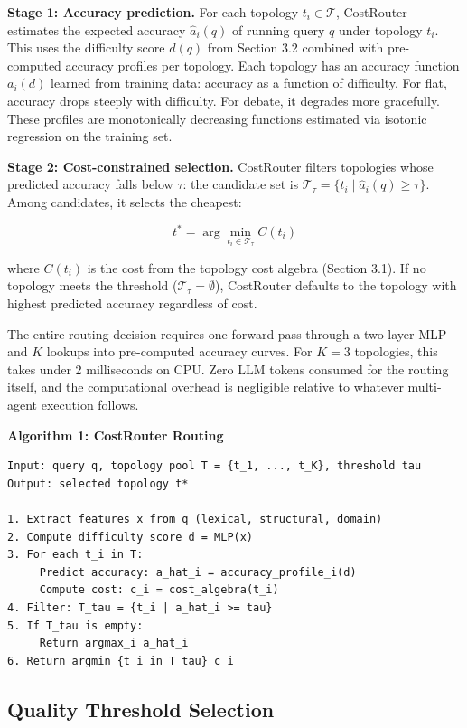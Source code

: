 \textbf{Stage 1: Accuracy prediction.} For each topology $t_i \in \mathcal{T}$, CostRouter estimates the expected accuracy $\hat{a}_i(q)$ of running query $q$ under topology $t_i$. This uses the difficulty score $d(q)$ from Section 3.2 combined with pre-computed accuracy profiles per topology. Each topology has an accuracy function $a_i(d)$ learned from training data: accuracy as a function of difficulty. For flat, accuracy drops steeply with difficulty. For debate, it degrades more gracefully. These profiles are monotonically decreasing functions estimated via isotonic regression on the training set.

\textbf{Stage 2: Cost-constrained selection.} CostRouter filters topologies whose predicted accuracy falls below $\tau$: the candidate set is $\mathcal{T}_\tau = \{t_i \mid \hat{a}_i(q) \geq \tau\}$. Among candidates, it selects the cheapest:

$$t^* = \arg\min_{t_i \in \mathcal{T}_\tau} C(t_i)$$

where $C(t_i)$ is the cost from the topology cost algebra (Section 3.1). If no topology meets the threshold ($\mathcal{T}_\tau = \emptyset$), CostRouter defaults to the topology with highest predicted accuracy regardless of cost.


The entire routing decision requires one forward pass through a two-layer MLP and $K$ lookups into pre-computed accuracy curves. For $K = 3$ topologies, this takes under 2 milliseconds on CPU. Zero LLM tokens consumed for the routing itself, and the computational overhead is negligible relative to whatever multi-agent execution follows.

\textbf{Algorithm 1: CostRouter Routing}

\begin{verbatim}
Input: query q, topology pool T = {t_1, ..., t_K}, threshold tau
Output: selected topology t*

1. Extract features x from q (lexical, structural, domain)
2. Compute difficulty score d = MLP(x)
3. For each t_i in T:
     Predict accuracy: a_hat_i = accuracy_profile_i(d)
     Compute cost: c_i = cost_algebra(t_i)
4. Filter: T_tau = {t_i | a_hat_i >= tau}
5. If T_tau is empty:
     Return argmax_i a_hat_i
6. Return argmin_{t_i in T_tau} c_i
\end{verbatim}

\subsection{Quality Threshold Selection}\label{quality-threshold-selection}

